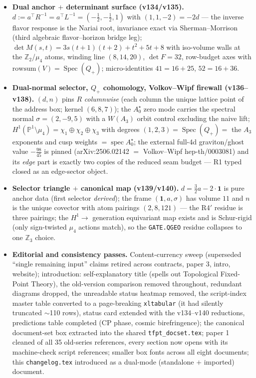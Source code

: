 \begin{itemize}
  reduced seam route carries pure anchor ratios ($-\tfrac43$ $=$ minus the seed gain), the
  naive 4d route ($-\tfrac{109}{45}$) carries no atom (v133).
\item \textbf{Dual anchor $+$ determinant surface (v134/v135).} $d:=a^\top R^{-1}=a^\top
  L^{-1}=(-\tfrac12,-\tfrac12,1)$ with $(1,1,-2)=-2d$ --- the inverse flavor response is the
  Nariai root, invariance exact via Sherman--Morrison (third algebraic flavor--horizon bridge
  leg); $\det M(s,t)=3s(t{+}1)(t{+}2)+t^2+5t+8$ with iso-volume walls at the $\mathbb
  Z_2$/$\mu_4$ atoms, winding line $(8,14,20)$, $\det F=32$, row-budget axes with
  $\mathrm{rowsum}(V)=\operatorname{Spec}(Q_+)$; micro-identities $41=16+25$, $52=16+36$.
\item \textbf{Dual-normal selector, $Q_+$ cohomology, Volkov--Wipf firewall (v136--v138).}
  $(d,n)$ pins $R$ \emph{columnwise} (each column the unique lattice point of the address
  box; kernel $(6,8,7)$); the $A_0^\star$ zero mode carries the spectral normal
  $\sigma=(2,-9,5)$ with a $W(A_3)$ orbit control excluding the naive lift;
  $H^1(\mathbb P^1\setminus\mu_4)=\chi_1\oplus\chi_2\oplus\chi_3$ with degrees
  $(1,2,3)=\operatorname{Spec}(Q_+)=$ the $A_3$ exponents and cusp weights
  $=\operatorname{spec}A_0^\star$; the external full-4d graviton/ghost value $-\tfrac{98}{45}$
  is pinned (arXiv:2506.02142 $=$ Volkov--Wipf hep-th/0003081) and its \emph{edge} part is
  exactly two copies of the reduced seam budget --- R1 typed closed as an edge-sector object.
\item \textbf{Selector triangle $+$ canonical map (v139/v140).} $d=\tfrac32a-2\cdot\mathbf 1$
  is pure anchor data (first selector \emph{derived}); the frame $(\mathbf 1,a,\sigma)$ has
  volume $11$ and $n$ is the unique covector with atom pairings $(2,8,121)$ --- the R4$'$
  residue is three pairings; the $H^1\to$ generation equivariant map exists and is
  Schur-rigid (only sign-twisted $\mu_4$ actions match), so the \texttt{GATE.QGEO} residue
  collapses to one $\mathbb Z_3$ choice.
\item \textbf{Editorial and consistency passes.} Content-currency sweep (superseded
  ``single remaining input'' claims retired across contracts, paper 3, intro, website);
  introduction: self-explanatory title (spells out Topological Fixed-Point Theory), the
  old-version comparison removed throughout, redundant diagrams dropped, the unreadable
  status heatmap removed, the script-index master table converted to a page-breaking
  \texttt{xltabular} (it had silently truncated $\sim$110 rows), status card extended with
  the v134--v140 reductions, predictions table completed (CP phase, cosmic birefringence);
  the canonical document-set box extracted into the shared \texttt{tfpt\_docset.tex}; paper 1
  cleaned of all 35 old-series references, every section now opens with its machine-check
  script references; smaller box fonts across all eight documents; this \texttt{changelog.tex}
  introduced as a dual-mode (standalone $+$ imported) document.
\end{itemize}

